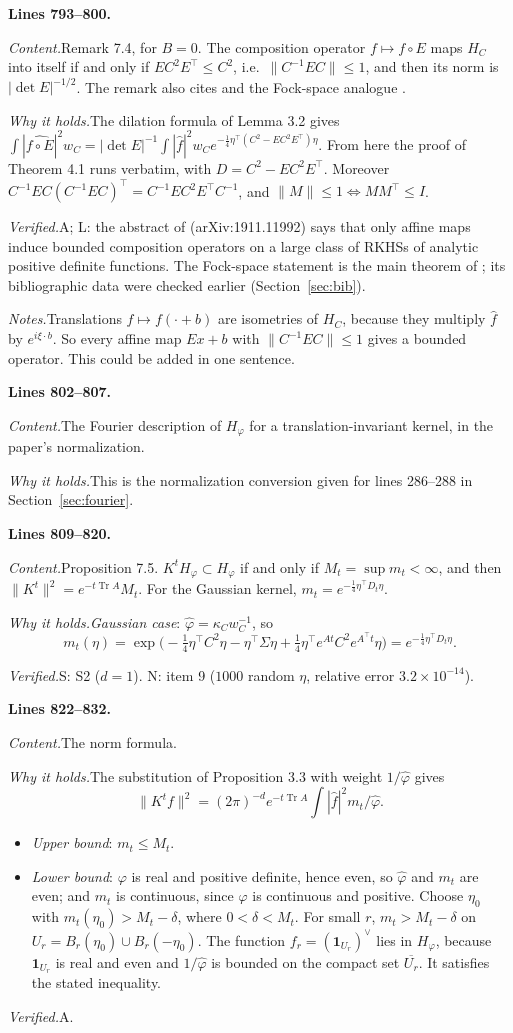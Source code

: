 \documentclass[11pt]{amsart}
\newcommand{\Tr}{\operatorname{Tr}}
\newcommand{\hatf}[1]{\widehat{#1}}
\newcommand{\tp}{\top}
\newcommand{\src}[1]{\par\bigskip\noindent\textbf{Lines #1.}\enspace}
\newcommand{\content}{\par\smallskip\noindent\textit{Content.}\enspace}
\newcommand{\why}{\par\smallskip\noindent\textit{Why it holds.}\enspace}
\newcommand{\verified}{\par\smallskip\noindent\textit{Verified.}\enspace}
\newcommand{\notes}{\par\smallskip\noindent\textit{Notes.}\enspace}
\newcommand{\tA}{\textsf{A}}
\newcommand{\tS}{\textsf{S}}
\newcommand{\tN}{\textsf{N}}
\newcommand{\tL}{\textsf{L}}
\begin{document}
\src{793--800}
\content Remark 7.4, for $B=0$. The composition operator $f\mapsto f\circ E$ maps $H_C$ into itself if and only if
$EC^2E^\tp\le C^2$, i.e.\ $\|C^{-1}EC\|\le1$, and then its norm is $|\det E|^{-1/2}$. The remark also cites
\cite{IIS} and the Fock-space analogue \cite{CarswellMacCluerSchuster}.
\why The dilation formula of Lemma 3.2 gives $\int|\hatf{f\circ E}|^2w_C=|\det E|^{-1}\int|\hatf f|^2w_C
e^{-\frac14\eta^\tp(C^2-EC^2E^\tp)\eta}$. From here the proof of Theorem 4.1 runs verbatim, with
$D=C^2-EC^2E^\tp$. Moreover $C^{-1}EC(C^{-1}EC)^\tp=C^{-1}EC^2E^\tp C^{-1}$, and
$\|M\|\le1\iff MM^\tp\le I$.
\verified \tA; \tL: the abstract of \cite{IIS} (arXiv:1911.11992) says that only affine maps induce bounded
composition operators on a large class of RKHSs of analytic positive definite functions. The Fock-space statement is
the main theorem of \cite{CarswellMacCluerSchuster}; its bibliographic data were checked earlier (Section~\ref{sec:bib}).
\notes Translations $f\mapsto f(\cdot+b)$ are isometries of $H_C$, because they multiply $\hatf f$ by $e^{i\xi\cdot b}$.
So every affine map $Ex+b$ with $\|C^{-1}EC\|\le1$ gives a bounded operator. This could be added in one sentence.

\src{802--807}
\content The Fourier description of $H_\varphi$ for a translation-invariant kernel, in the paper's normalization.
\why This is the normalization conversion given for lines 286--288 in Section~\ref{sec:fourier}.

\src{809--820}
\content Proposition 7.5. $K^tH_\varphi\subset H_\varphi$ if and only if $M_t=\sup m_t<\infty$, and then
$\|K^t\|^2=e^{-t\Tr A}M_t$. For the Gaussian kernel, $m_t=e^{-\frac14\eta^\tp D_t\eta}$.
\why \emph{Gaussian case}: $\hatf\varphi=\kappa_Cw_C^{-1}$, so
\[
m_t(\eta)=\exp\bigl(-\tfrac14\eta^\tp C^2\eta-\eta^\tp\Sigma\eta+\tfrac14\eta^\tp e^{At}C^2e^{A^\tp t}\eta\bigr)
=e^{-\frac14\eta^\tp D_t\eta}.
\]
\verified \tS: S2 ($d=1$). \tN: item 9 ($1000$ random $\eta$, relative error $3.2\times10^{-14}$).

\src{822--832}
\content The norm formula.
\why The substitution of Proposition 3.3 with weight $1/\hatf\varphi$ gives
\[
\|K^tf\|^2=(2\pi)^{-d}e^{-t\Tr A}\int|\hatf f|^2m_t/\hatf\varphi .
\]
\begin{itemize}
\item \emph{Upper bound}: $m_t\le M_t$.
\item \emph{Lower bound}: $\varphi$ is real and positive definite, hence even, so $\hatf\varphi$ and $m_t$ are even; and
$m_t$ is continuous, since $\hatf\varphi$ is continuous and positive. Choose $\eta_0$ with $m_t(\eta_0)>M_t-\delta$,
where $0<\delta<M_t$. For small $r$, $m_t>M_t-\delta$ on $U_r=B_r(\eta_0)\cup B_r(-\eta_0)$. The function
$f_r=(\mathbf 1_{U_r})^\vee$ lies in $H_\varphi$, because $\mathbf 1_{U_r}$ is real and even and $1/\hatf\varphi$ is
bounded on the compact set $\overline{U_r}$. It satisfies the stated inequality.
\end{itemize}
\verified \tA.
\end{document}
